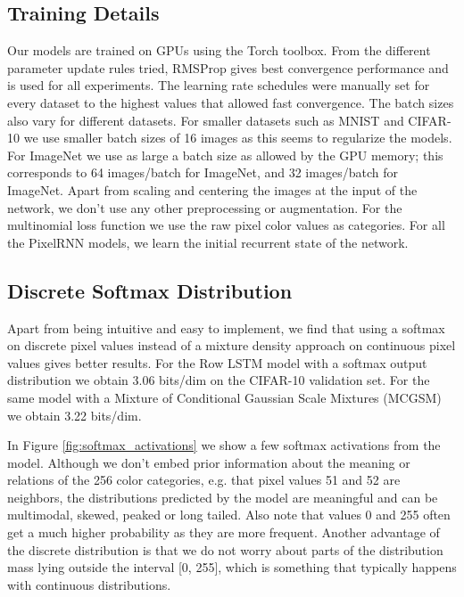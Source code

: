 \documentclass{article}
\begin{document}
\subsection{Training Details}
\label{sect:training_details}

Our models are trained on GPUs using the Torch toolbox. From the different parameter update rules tried, RMSProp gives best convergence performance and is used for all experiments. The learning rate schedules were manually set for every dataset to the highest values that allowed fast convergence. The batch sizes also vary for different datasets. For smaller datasets such as MNIST and CIFAR-10 we use smaller batch sizes of 16 images as this seems to regularize the models. For ImageNet we use as large a batch size as allowed by the GPU memory; this corresponds to 64 images/batch for  ImageNet, and 32 images/batch for  ImageNet. Apart from scaling and centering the images at the input of the network, we don't use any other preprocessing or augmentation. For the multinomial loss function we use the raw pixel color values as categories. For all the PixelRNN models, we learn the initial recurrent state of the network.

\subsection{Discrete Softmax Distribution}
Apart from being intuitive and easy to implement, we find that using a softmax on discrete pixel values instead of a mixture density approach on continuous pixel values gives better results. For the Row LSTM model with a softmax output distribution we obtain 3.06 bits/dim on the CIFAR-10 validation set. For the same model with a Mixture of Conditional Gaussian Scale Mixtures (MCGSM) \cite{theis2015generative} we obtain 3.22 bits/dim. 

In Figure \ref{fig:softmax_activations} we show a few softmax activations from the model. Although we don't embed prior information about the meaning or relations of the 256 color categories, e.g. that pixel values 51 and 52 are neighbors, the distributions predicted by the model are meaningful and can be multimodal, skewed, peaked or long tailed. Also note that values 0 and 255 often get a much higher probability as they are more frequent. Another advantage of the discrete distribution is that we do not worry about parts of the distribution mass lying outside the interval [0, 255], which is something that typically happens with continuous distributions.
\end{document}
